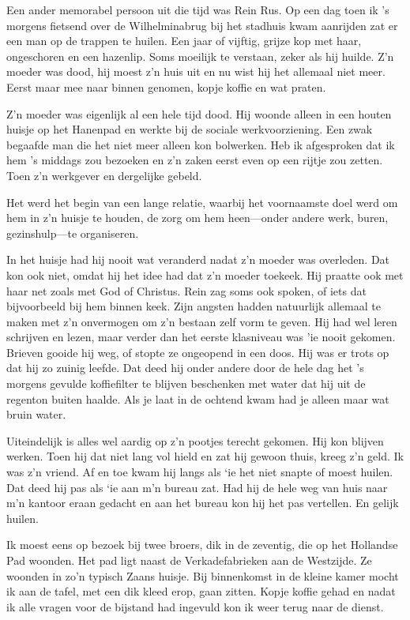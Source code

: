 \documentclass[10pt,twoside,openright]{memoir}
\begin{document}
Een ander memorabel persoon uit die tijd was Rein Rus. Op een dag toen ik ’s morgens fietsend over de Wilhelminabrug bij het stadhuis kwam aanrijden zat er een man op de trappen te huilen. Een jaar of vijftig, grijze kop met haar, ongeschoren en een hazenlip. Soms moeilijk te verstaan, zeker als hij huilde. Z’n moeder was dood, hij moest z’n huis uit en nu wist hij het allemaal niet meer. Eerst maar mee naar binnen genomen, kopje koffie en wat praten. 

Z’n moeder was eigenlijk al een hele tijd dood. Hij woonde alleen in een houten huisje op het Hanenpad en werkte bij de sociale werkvoorziening. Een zwak begaafde man die het niet meer alleen kon bolwerken. Heb ik afgesproken dat ik hem ’s middags zou bezoeken en z’n zaken eerst even op een rijtje zou zetten. Toen z'n werkgever en dergelijke gebeld. 

Het werd het begin van een lange relatie, waarbij het voornaamste doel werd om hem in z’n huisje te houden, de zorg om hem heen---onder andere werk, buren, gezinshulp---te organiseren. 

In het huisje had hij nooit wat veranderd nadat z’n moeder was overleden. Dat kon ook niet, omdat hij het idee had dat z’n moeder toekeek. Hij praatte ook met haar net zoals met God of Christus. Rein zag soms ook spoken, of iets dat bijvoorbeeld bij hem binnen keek. Zijn angsten hadden natuurlijk allemaal te maken met z’n onvermogen om z’n bestaan zelf vorm te geven. Hij had wel leren schrijven en lezen, maar verder dan het eerste klasniveau was 'ie nooit gekomen. Brieven gooide hij weg, of stopte ze ongeopend in een doos. Hij was er trots op dat hij zo zuinig leefde. Dat deed hij onder andere door de hele dag het ’s morgens gevulde koffiefilter te blijven beschenken met water dat hij uit de regenton buiten haalde. Als je laat in de ochtend kwam had je alleen maar wat bruin water. 

Uiteindelijk is alles wel aardig op z’n pootjes terecht gekomen. Hij kon blijven werken. Toen hij dat niet lang vol hield en zat hij gewoon thuis, kreeg z’n geld. Ik was z’n vriend. Af en toe kwam hij langs als `ie het niet snapte of moest huilen. Dat deed hij pas als `ie aan m’n bureau zat. Had hij de hele weg van huis naar m’n kantoor eraan gedacht en aan het bureau kon hij het pas vertellen. En gelijk huilen.

Ik moest eens op bezoek bij twee broers, dik in de zeventig, die op het Hollandse Pad woonden. Het pad ligt naast de Verkadefabrieken aan de Westzijde. Ze woonden in zo’n typisch Zaans huisje. Bij binnenkomst in de kleine kamer mocht ik aan de tafel, met een dik kleed erop, gaan zitten. Kopje koffie gehad en nadat ik alle vragen voor de bijstand had ingevuld kon ik weer terug naar de dienst. 
\end{document}

